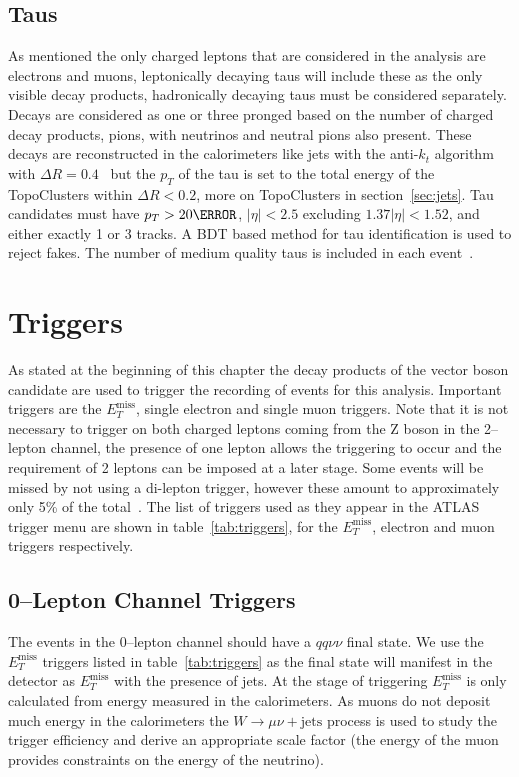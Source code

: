 \subsection{Taus}

As mentioned the only charged leptons that are considered in the analysis are
electrons and muons, leptonically decaying taus will include these as the only
visible decay products, hadronically decaying taus must be considered
separately. Decays are considered as one or three pronged based on the number of
charged decay products, pions, with neutrinos and neutral pions also present.
These decays are reconstructed in the calorimeters like jets with the anti-$k_t$
algorithm with $\Delta R = 0.4$~\cite{ATL-PHYS-PUB-2015-045} but the $p_T$ of
the tau is set to the total energy of the TopoClusters within $\Delta R < 0.2$,
more on TopoClusters in section~\ref{sec:jets}. Tau candidates must have $p_T >
20 \GeV$, $\lvert  \eta \rvert < 2.5$ excluding $1.37 \lvert \eta \rvert <
1.52$, and either exactly 1 or 3 tracks. A BDT based method for tau
identification is used to reject fakes. The number of medium quality taus is
included in each event~\cite{TauRecommendation2015,TauRecommendation2016}.

\section{Triggers}
\label{sec:triggers}

As stated at the beginning of this chapter the decay products of the vector
boson candidate are used to trigger the recording of events for this analysis.
Important triggers are the $E_T^{\text{miss}}$, single electron and single muon
triggers. Note that it is not necessary to trigger on both charged leptons
coming from the Z boson in the 2--lepton channel, the presence of one lepton
allows the triggering to occur and the requirement of 2 leptons can be imposed
at a later stage. Some events will be missed by not using a di-lepton trigger,
however these amount to approximately only 5\% of the
total~\cite{VHObjectNote2019}. The list of triggers used as they appear in the
ATLAS trigger menu are shown in table~\ref{tab:triggers}, for the
$E_T^{\text{miss}}$, electron and muon triggers respectively.


\subsection{0--Lepton Channel Triggers}
The events in the 0--lepton channel should have a $qq\nu\nu$ final state. We use
the $E_T^{\text{miss}}$ triggers listed in table~\ref{tab:triggers} as the final
state will manifest in the detector as $E_T^{\text{miss}}$ with the presence of
jets. At the stage of triggering $E_T^{\text{miss}}$ is only calculated from
energy measured in the calorimeters. As muons do not deposit much energy in the
calorimeters the $W \to \mu \nu + \text{jets}$ process is used to study the
trigger efficiency and derive an appropriate scale factor (the energy of the
muon provides constraints on the energy of the neutrino).

